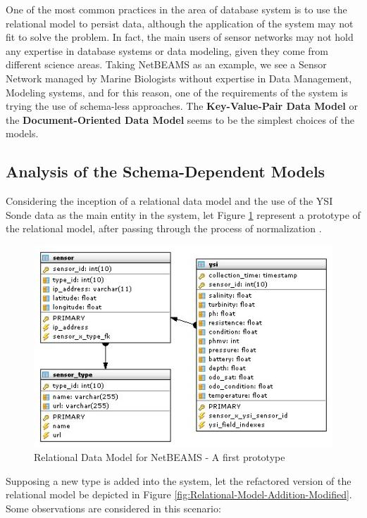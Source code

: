 One of the most common practices in the area of database system is to use the
relational model to persist data, although the application of the system may
not fit to solve the problem. In fact, the main users of sensor networks may
not hold any expertise in database systems or data modeling, given they come
from different science areas. Taking NetBEAMS as an example, we see a Sensor
Network managed by Marine Biologists without expertise in Data Management,
Modeling systems, and for this reason, one of the requirements of the system is
trying the use of schema-less approaches. The \textbf{Key-Value-Pair Data
Model} or the \textbf{Document-Oriented Data Model} seems to be the simplest
choices of the models.

\subsection{Analysis of the Schema-Dependent Models}

Considering the inception of a relational data model \cite{relational-model}
and the use of the YSI Sonde data as the main entity in the system, let Figure
\ref{fig:Relational-Model-Original} represent a prototype of the relational model, after passing through the process of
normalization \cite{db-normalization}.

\begin{figure}
  \centering
  \includegraphics[scale=0.65]{../diagrams/Relational-Model-Original}
  \caption{Relational Data Model for NetBEAMS - A first prototype}
  \label{fig:Relational-Model-Original}
\end{figure}

Supposing a new type is added into the system, let the refactored version of
the relational model be depicted in Figure
\ref{fig:Relational-Model-Addition-Modified}. Some observations are
considered in this scenario:

